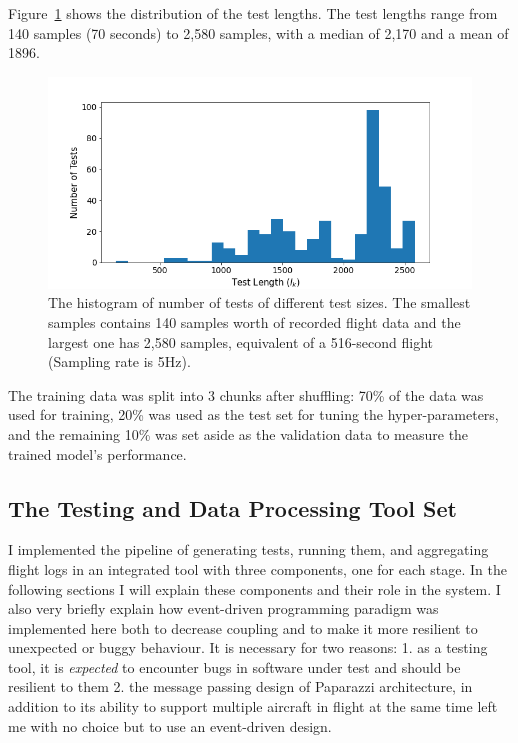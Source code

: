 Figure~\ref{fig:paparazzi_test_length} shows the distribution of the test lengths. The test lengths range from 140 samples (70 seconds) to 2,580 samples, with a median of 2,170 and a mean of 1896.
\begin{figure}
    \centering
    \includegraphics[width=\columnwidth]{RQ3-5_charts/test_lengths.png}
    \caption{The histogram of number of tests of different test sizes. The smallest samples contains 140 samples worth of recorded flight data and the largest one has 2,580 samples, equivalent of a 516-second flight (Sampling rate is 5Hz). }
    \label{fig:paparazzi_test_length}
\end{figure}

The training data was split into 3 chunks after shuffling: 70\% of the data was used for training, 20\% was used as the test set for tuning the hyper-parameters, and the remaining 10\% was set aside as the validation data to measure the trained model's performance. 







\subsection{The Testing and Data Processing Tool Set}\label{section:fuzzing_tool}
I implemented the pipeline of generating tests, running them, and aggregating flight logs in an integrated tool with three components, one for each stage. In the following sections I will explain these components and their role in the system. I also very briefly explain how event-driven programming paradigm was implemented here both to decrease coupling and to make it more resilient to unexpected or buggy behaviour. It is necessary for two reasons: 1. as a testing tool, it is \textit{expected} to encounter bugs in software under test and should be resilient to them 2. the message passing design of Paparazzi architecture, in addition to its ability to support multiple aircraft in flight at the same time left me with no choice but to use an event-driven design.


